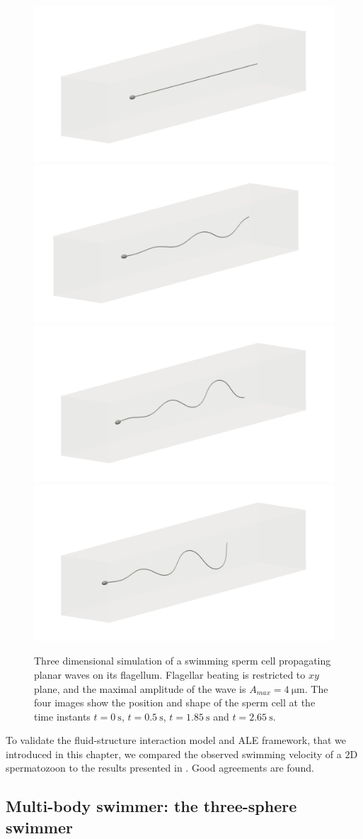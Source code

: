 \documentclass[graybox]{svmult}
\begin{document}
\begin{figure}
	\centering
	\includegraphics[width=0.45\linewidth]{img-3d_sperm_planar-3dswimmer_00.png}
	\includegraphics[width=0.45\linewidth]{img-3d_sperm_planar-3dswimmer_0dot5.png}
	\includegraphics[width=0.45\linewidth]{img-3d_sperm_planar-3dswimmer_1dot85.png}
	\includegraphics[width=0.45\linewidth]{img-3d_sperm_planar-3dswimmer_2dot65.png}
	\caption{Three dimensional simulation of a swimming sperm cell propagating planar waves on its flagellum. Flagellar beating is restricted to $xy$ plane, and the maximal amplitude of the wave is $A_{max}=\SI{4}{\micro\meter}$. The four images show the position and shape of the sperm cell at the time instants $t=\SI{0}{\second}$, $t=\SI{0.5}{\second}$, $t=\SI{1.85}{\second}$ and $t=\SI{2.65}{\second}$. }
	\label{Fig:3dsperm_planar}
\end{figure}


To validate the fluid-structure interaction model and ALE framework, that we introduced in this chapter, we compared the observed swimming velocity of a $2$D spermatozoon to the results presented in \cite{razavi_ale-based_2015}. Good agreements are found. 

\subsection{Multi-body swimmer: the three-sphere swimmer}
\end{document}

